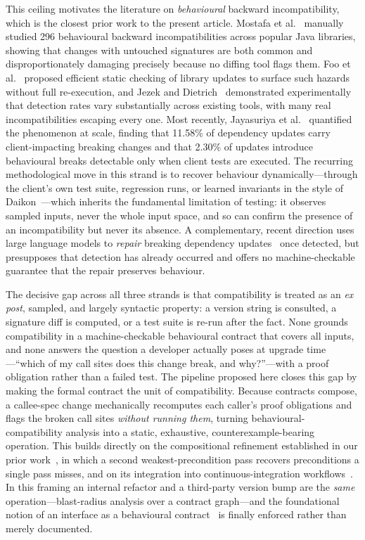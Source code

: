 This ceiling motivates the literature on \emph{behavioural} backward incompatibility, which is the closest prior work to the present article. Mostafa et al.~\cite{mostafa2017behavioral} manually studied 296 behavioural backward incompatibilities across popular Java libraries, showing that changes with untouched signatures are both common and disproportionately damaging precisely because no diffing tool flags them. Foo et al.~\cite{foo2018efficient} proposed efficient static checking of library updates to surface such hazards without full re-execution, and Jezek and Dietrich~\cite{jezek2017magic} demonstrated experimentally that detection rates vary substantially across existing tools, with many real incompatibilities escaping every one. Most recently, Jayasuriya et al.~\cite{jayasuriya2024understanding} quantified the phenomenon at scale, finding that 11.58\% of dependency updates carry client-impacting breaking changes and that 2.30\% of updates introduce behavioural breaks detectable only when client tests are executed. The recurring methodological move in this strand is to recover behaviour dynamically---through the client's own test suite, regression runs, or learned invariants in the style of Daikon~\cite{ernst2007daikon}---which inherits the fundamental limitation of testing: it observes sampled inputs, never the whole input space, and so can confirm the presence of an incompatibility but never its absence. A complementary, recent direction uses large language models to \emph{repair} breaking dependency updates~\cite{islam2025byam} once detected, but presupposes that detection has already occurred and offers no machine-checkable guarantee that the repair preserves behaviour.

The decisive gap across all three strands is that compatibility is treated as an \emph{ex post}, sampled, and largely syntactic property: a version string is consulted, a signature diff is computed, or a test suite is re-run after the fact. None grounds compatibility in a machine-checkable behavioural contract that covers all inputs, and none answers the question a developer actually poses at upgrade time---``which of my call sites does this change break, and why?''---with a proof obligation rather than a failed test. The pipeline proposed here closes this gap by making the formal contract the unit of compatibility. Because contracts compose, a callee-spec change mechanically recomputes each caller's proof obligations and flags the broken call sites \emph{without running them}, turning behavioural-compatibility analysis into a static, exhaustive, counterexample-bearing operation. This builds directly on the compositional refinement established in our prior work~\cite{edmonds_article3}, in which a second weakest-precondition pass recovers preconditions a single pass misses, and on its integration into continuous-integration workflows~\cite{edmonds_article4}. In this framing an internal refactor and a third-party version bump are the \emph{same} operation---blast-radius analysis over a contract graph---and the foundational notion of an interface as a behavioural contract~\cite{meyer1992dbc} is finally enforced rather than merely documented.
